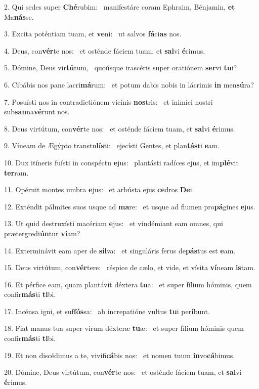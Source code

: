 2. Qui sedes super \textbf{Ché}rubim: \ast\  manifestáre coram Ephraim, Bénjamin, \textbf{et} Ma\textbf{nás}se.\

3. Excita poténtiam tuam, et \textbf{ve}ni: \ast\  ut salvos \textbf{fá}ci\textbf{as} nos.\

4. Deus, con\textbf{vér}te nos: \ast\  et osténde fáciem tuam, et \textbf{sal}vi \textbf{é}rimus.\

5. Dómine, Deus vir\textbf{tú}tum, \ast\  quoúsque irascéris super oratiónem \textbf{ser}vi \textbf{tu}i?\

6. Cibábis nos pane lacri\textbf{má}rum: \ast\  et potum dabis nobis in lácrimis \textbf{in} men\textbf{sú}ra?\

7. Posuísti nos in contradictiónem vicínis \textbf{nos}tris: \ast\  et inimíci nostri sub\textbf{san}na\textbf{vé}runt nos.\

8. Deus virtútum, con\textbf{vér}te nos: \ast\  et osténde fáciem tuam, et \textbf{sal}vi \textbf{é}rimus.\

9. Víneam de Ægýpto transtu\textbf{lís}ti: \ast\  ejecísti Gentes, et plan\textbf{tás}ti \textbf{e}am.\

10. Dux itíneris fuísti in conspéctu \textbf{e}jus: \ast\  plantásti radíces ejus, et im\textbf{plé}vit \textbf{ter}ram.\

11. Opéruit montes umbra \textbf{e}jus: \ast\  et arbústa ejus \textbf{ce}dros \textbf{De}i.\

12. Exténdit pálmites suos usque ad \textbf{ma}re: \ast\  et usque ad flumen pro\textbf{pá}gines \textbf{e}jus.\

13. Ut quid destruxísti macériam \textbf{e}jus: \ast\  et vindémiant eam omnes, qui prætergredi\textbf{ún}tur \textbf{vi}am?\

14. Exterminávit eam aper de \textbf{sil}va: \ast\  et singuláris ferus de\textbf{pás}tus est \textbf{e}am.\

15. Deus virtútum, con\textbf{vér}tere: \ast\  réspice de cælo, et vide, et vísita \textbf{ví}neam \textbf{is}tam.\

16. Et pérfice eam, quam plantávit déxtera \textbf{tu}a: \ast\  et super fílium hóminis, quem confir\textbf{más}ti \textbf{ti}bi.\

17. Incénsa igni, et suf\textbf{fós}sa: \ast\  ab increpatióne vultus \textbf{tu}i per\textbf{í}bunt.\

18. Fiat manus tua super virum déxteræ \textbf{tu}æ: \ast\  et super fílium hóminis quem confir\textbf{más}ti \textbf{ti}bi.\

19. Et non discédimus a te, vivifi\textbf{cá}bis nos: \ast\  et nomen tuum \textbf{in}vo\textbf{cá}bimus.\

20. Dómine, Deus virtútum, con\textbf{vér}te nos: \ast\  et osténde fáciem tuam, et \textbf{sal}vi \textbf{é}rimus.\

